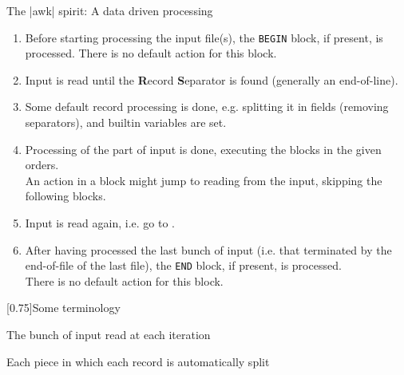 \begin{frame}{The \bash|awk| spirit: A data driven processing}
    \vspace{-1mm}
    \begin{enumerate}
        \item Before starting processing the input file(s), the \texttt{BEGIN} block, if present, is processed.
              There is no default action for this block.
        \item Input is read until the \textbf{R}ecord \textbf{S}eparator is found (generally an end-of-line).
        \item Some default record processing is done, e.g. splitting it in fields (removing separators), and builtin variables are set.
        \item Processing of the part of input is done, executing the blocks in the given orders.\\
              An action in a block might jump to reading from the input, skipping the following blocks.
        \item Input is read again, i.e. go to .
        \item After having processed the last bunch of input (i.e. that terminated by the end-of-file of the last file), the \texttt{END} block, if present, is processed.\\
              There is no default action for this block.
    \end{enumerate}
    \begin{varblock}{}[0.75\textwidth]{Some terminology}
        \begin{description}
            \item[\textbf{Record:}] The bunch of input read at each iteration
            \item[\textbf{Field:}] Each piece in which each record is automatically split
        \end{description}
    \end{varblock}
\end{frame}
